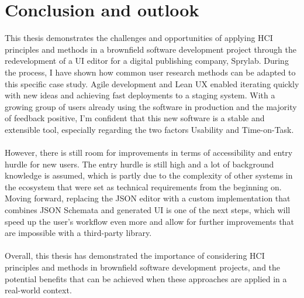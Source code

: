 %
\chapter{Conclusion and outlook}
\label{chap:conclusion}      
This thesis demonstrates the challenges and opportunities of applying HCI principles and methods in a brownfield software development project through the redevelopment of a UI editor for a digital publishing company, Sprylab.
During the process, I have shown how common user research methods can be adapted to this specific case study.
Agile development and Lean UX enabled iterating quickly with new ideas and achieving fast deployments to a staging system.
With a growing group of users already using the software in production and the majority of feedback positive, I'm confident that this new software is a stable and extensible tool, especially regarding the two factors Usability and Time-on-Task.
\\\\
However, there is still room for improvements in terms of accessibility and entry hurdle for new users.
The entry hurdle is still high and a lot of background knowledge is assumed, which is partly due to the complexity of other systems in the ecosystem that were set as technical requirements from the beginning on.
Moving forward, replacing the JSON editor with a custom implementation that combines JSON Schemata and generated UI is one of the next steps, which will speed up the user's
workflow even more and allow for further improvements that are impossible with a third-party library.
\\\\
Overall, this thesis has demonstrated the importance of considering HCI principles and methods in brownfield software development projects, and the potential benefits that can be achieved when these approaches are applied in a real-world context.